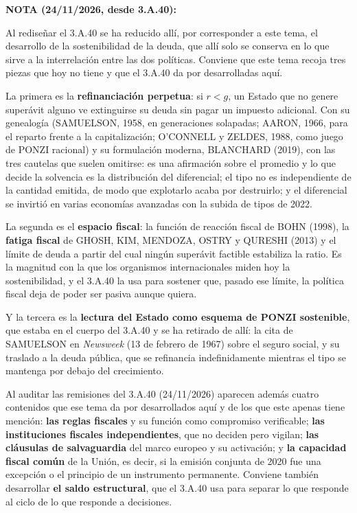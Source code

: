 \documentclass[10pt,a4paper]{article}
\begin{document}
{    \textbf{NOTA (24/11/2026, desde 3.A.40):} {\color{magenta}Al rediseñar el 3.A.40 se ha reducido allí, por corresponder a este tema, el desarrollo de la sostenibilidad de la deuda, que allí solo se conserva en lo que sirve a la interrelación entre las dos políticas. Conviene que este tema recoja tres piezas que hoy no tiene y que el 3.A.40 da por desarrolladas aquí.

    La primera es la \textbf{refinanciación perpetua}: si $r<g$, un Estado que no genere superávit alguno ve extinguirse su deuda sin pagar un impuesto adicional. Con su genealogía (SAMUELSON, 1958, en generaciones solapadas; AARON, 1966, para el reparto frente a la capitalización; O'CONNELL y ZELDES, 1988, como juego de PONZI racional) y su formulación moderna, BLANCHARD (2019), con las tres cautelas que suelen omitirse: es una afirmación sobre el promedio y lo que decide la solvencia es la distribución del diferencial; el tipo no es independiente de la cantidad emitida, de modo que explotarlo acaba por destruirlo; y el diferencial se invirtió en varias economías avanzadas con la subida de tipos de 2022.

    La segunda es el \textbf{espacio fiscal}: la función de reacción fiscal de BOHN (1998), la \textbf{fatiga fiscal} de GHOSH, KIM, MENDOZA, OSTRY y QURESHI (2013) y el límite de deuda a partir del cual ningún superávit factible estabiliza la ratio. Es la magnitud con la que los organismos internacionales miden hoy la sostenibilidad, y el 3.A.40 la usa para sostener que, pasado ese límite, la política fiscal deja de poder ser pasiva aunque quiera.

    Y la tercera es la \textbf{lectura del Estado como esquema de PONZI sostenible}, que estaba en el cuerpo del 3.A.40 y se ha retirado de allí: la cita de SAMUELSON en \textit{Newsweek} (13 de febrero de 1967) sobre el seguro social, y su traslado a la deuda pública, que se refinancia indefinidamente mientras el tipo se mantenga por debajo del crecimiento.

    Al auditar las remisiones del 3.A.40 (24/11/2026) aparecen además cuatro contenidos que ese tema da por desarrollados aquí y de los que este apenas tiene mención: \textbf{las reglas fiscales} y su función como compromiso verificable; \textbf{las instituciones fiscales independientes}, que no deciden pero vigilan; \textbf{las cláusulas de salvaguardia} del marco europeo y su activación; y \textbf{la capacidad fiscal común} de la Unión, es decir, si la emisión conjunta de 2020 fue una excepción o el principio de un instrumento permanente. Conviene también desarrollar \textbf{el saldo estructural}, que el 3.A.40 usa para separar lo que responde al ciclo de lo que responde a decisiones.}
    
}
\end{document}

